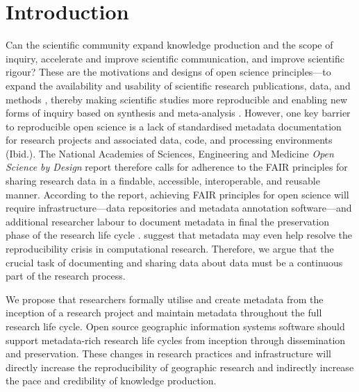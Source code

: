 \documentclass{isprs} %
\begin{document}

\maketitle


\sloppy

\section{Introduction}\label{Introduction}

Can the scientific community expand knowledge production and the scope of inquiry, accelerate and improve scientific communication, and improve scientific rigour?
These are the motivations and designs of open science principles---to expand the availability and usability of scientific research publications, data, and methods \citep{NASEM2018}, thereby making scientific studies more reproducible  and enabling new forms of inquiry based on synthesis and meta-analysis \citep{NASEM2018,NASEM2019}.
However, one key barrier to reproducible open science is a lack of standardised metadata documentation for research projects and associated data, code, and processing environments (Ibid.).
The National Academies of Sciences, Engineering and Medicine \citep{NASEM2018} \textit{Open Science by Design} report therefore calls for adherence to the FAIR principles \citep{Wilkinson2016} for sharing research data in a findable, accessible, interoperable, and reusable manner.
According to the report, achieving FAIR principles for open science will require infrastructure---data repositories and metadata annotation software---and additional researcher labour to document metadata in final the preservation phase of the research life cycle \citep{NASEM2018}. 
\citet{Leipzig2021} suggest that metadata may even help resolve the reproducibility crisis in computational research.
Therefore, we argue that the crucial task of documenting and sharing data about data must be a continuous part of the research process.

We propose that researchers formally utilise and create metadata from the inception of a research project and maintain metadata throughout the full research life cycle.
Open source geographic information systems software should support metadata-rich research life cycles from inception through dissemination and preservation.
These changes in research practices and infrastructure will directly increase the reproducibility of geographic research and indirectly increase the pace and credibility of knowledge production. 
\end{document}
